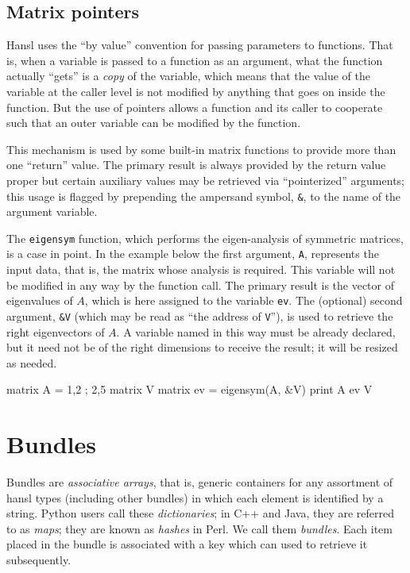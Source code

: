 \section{Matrix pointers}
\label{sec:mat-pointers}

Hansl uses the ``by value'' convention for passing parameters to
functions. That is, when a variable is passed to a function as an
argument, what the function actually ``gets'' is a \emph{copy} of the
variable, which means that the value of the variable at the caller
level is not modified by anything that goes on inside the function.
But the use of pointers allows a function and its caller to cooperate
such that an outer variable can be modified by the function.

This mechanism is used by some built-in matrix functions to provide
more than one ``return'' value. The primary result is always provided
by the return value proper but certain auxiliary values may be
retrieved via ``pointerized'' arguments; this usage is flagged by
prepending the ampersand symbol, \texttt{\&}, to the name of the
argument variable.

The \texttt{eigensym} function, which performs the eigen-analysis of
symmetric matrices, is a case in point. In the example below the first
argument, \texttt{A}, represents the input data, that is, the matrix
whose analysis is required. This variable will not be modified in any
way by the function call. The primary result is the vector of
eigenvalues of $A$, which is here assigned to the variable
\texttt{ev}. The (optional) second argument, \texttt{\&V} (which may
be read as ``the address of \texttt{V}''), is used to retrieve the
right eigenvectors of $A$. A variable named in this way must be
already declared, but it need not be of the right dimensions to
receive the result; it will be resized as needed.
\begin{code}
matrix A = {1,2 ; 2,5}
matrix V
matrix ev = eigensym(A, &V)
print A ev V
\end{code}

\chapter{Bundles}

Bundles are \emph{associative arrays}, that is, generic containers for
any assortment of hansl types (including other bundles) in which each
element is identified by a string. Python users call these
\emph{dictionaries}; in C++ and Java, they are referred to as
\emph{maps}; they are known as \emph{hashes} in Perl. We call them
\emph{bundles}. Each item placed in the bundle is associated with a
key which can used to retrieve it subsequently.

